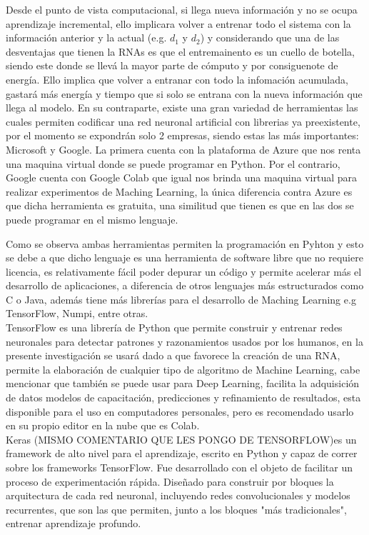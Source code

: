     Desde el punto de vista computacional, si llega nueva información y no se ocupa aprendizaje 
    incremental, ello implicara volver a entrenar todo el sistema con la información anterior y 
    la actual (e.g. $d_{1}$ y $d_{2}$) y considerando que una de las desventajas que tienen la 
    RNAs es que el entremainento es un cuello de botella, siendo este donde se llevá la mayor 
    parte de cómputo y por consiguenote de energía. Ello implica que volver a entranar con todo 
    la infomación acumulada, gastará más energía y tiempo que si solo se entrana con la nueva 
    información que llega al modelo. En su contraparte,  existe una gran variedad de herramientas 
    las cuales permiten codificar una red neuronal artificial con librerias ya preexistente, por 
    el momento se expondrán solo 2 empresas, siendo estas las más importantes: Microsoft y Google. 
    La primera cuenta con la plataforma de Azure que nos renta una maquina virtual donde se puede 
    programar en Python.  Por el contrario, Google cuenta con Google Colab que igual nos brinda 
    una maquina virtual para realizar experimentos de Maching Learning, la \'unica diferencia 
    contra Azure es que dicha herramienta es gratuita, una similitud que tienen es que en las 
    dos se puede programar en el mismo lenguaje.

    Como se observa ambas herramientas permiten la programaci\'on en Pyhton y esto se debe a que 
    dicho lenguaje es una herramienta de software libre que no requiere licencia, es relativamente 
    fácil poder depurar un código y permite acelerar más el desarrollo de aplicaciones,  a diferencia 
    de otros lenguajes más estructurados como C o Java, adem\'as tiene m\'as librerías para el 
    desarrollo de Maching Learning e.g TensorFlow, Numpi, entre otras. \\

    TensorFlow es una librería de Python que permite construir y entrenar redes neuronales para 
    detectar patrones y razonamientos usados por los humanos, en la presente investigaci\'on se 
    usar\'a dado a que favorece la creaci\'on de una RNA, permite la elaboraci\'on de cualquier 
    tipo de algoritmo de Machine Learning, cabe mencionar que también se puede usar para Deep Learning, 
    facilita la adquisici\'on de datos modelos de capacitaci\'on, predicciones y refinamiento de 
    resultados, esta disponible para el uso en computadores personales, pero es recomendado 
    usarlo en su propio editor en la nube que es Colab. \\ 

    Keras (MISMO COMENTARIO QUE LES PONGO DE TENSORFLOW)es un framework de alto nivel para 
    el aprendizaje, escrito en Python y capaz de correr sobre los frameworks TensorFlow. Fue 
    desarrollado con el objeto de facilitar un proceso de experimentación rápida. Diseñado 
    para construir por bloques la arquitectura de cada red neuronal, incluyendo redes 
    convolucionales y modelos recurrentes, que son las que permiten, junto a los bloques 
    "más tradicionales", entrenar aprendizaje profundo.
